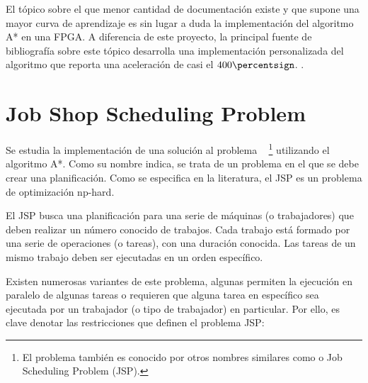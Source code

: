 El tópico sobre el que menor cantidad de documentación existe
y que supone una mayor curva de aprendizaje es sin lugar a duda
la implementación del algoritmo A* en una FPGA.
A diferencia de este proyecto, la principal fuente de bibliografía
sobre este tópico desarrolla una implementación personalizada del algoritmo
que reporta una aceleración de casi el $400\percentsign$.
\cite{ZJW20}.

\pagebreak

\section{Job Shop Scheduling Problem}

Se estudia la implementación de una solución al problema
~\cite{Yan77}
\footnote{El problema también es conocido por otros nombres similares
como  o Job Scheduling Problem (JSP).}
utilizando el algoritmo A*.
Como su nombre indica, se trata de un problema en el que se debe
crear una planificación.
Como se especifica en la literatura, el JSP es un problema de optimización np-hard.

El JSP busca una planificación para una serie de
máquinas (o trabajadores) que deben realizar un número conocido
de trabajos.
Cada trabajo está formado por una serie de operaciones (o tareas),
con una duración conocida.
Las tareas de un mismo trabajo deben ser ejecutadas en un orden específico.

Existen numerosas variantes de este problema,
algunas permiten la ejecución
en paralelo de algunas tareas o requieren que alguna tarea
en específico sea ejecutada por un trabajador (o tipo de trabajador)
en particular.
Por ello, es clave denotar las restricciones que definen el problema JSP\@:

